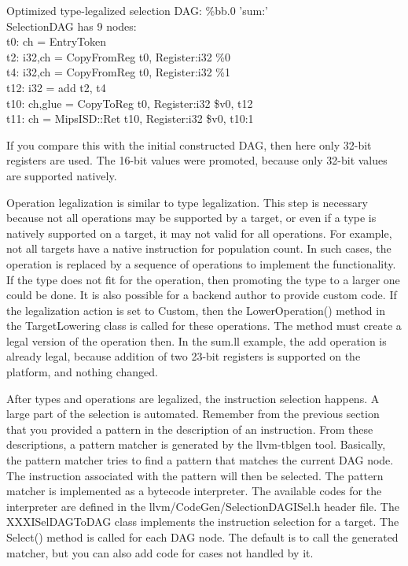 \begin{tcolorbox}[colback=white,colframe=black]
Optimized type-legalized selection DAG: \%bb.0 'sum:' \\
SelectionDAG has 9 nodes: \\
\hspace*{0.5cm}t0: ch = EntryToken \\
\hspace*{1.5cm}t2: i32,ch = CopyFromReg t0, Register:i32 \%0 \\
\hspace*{1.5cm}t4: i32,ch = CopyFromReg t0, Register:i32 \%1 \\
\hspace*{1cm}t12: i32 = add t2, t4 \\
\hspace*{0.5cm}t10: ch,glue = CopyToReg t0, Register:i32 \$v0, t12 \\
\hspace*{0.5cm}t11: ch = MipsISD::Ret t10, Register:i32 \$v0, t10:1
\end{tcolorbox}

If you compare this with the initial constructed DAG, then here only 32-bit registers are used. The 16-bit values were promoted, because only 32-bit values are supported natively.\par

Operation legalization is similar to type legalization. This step is necessary because not all operations may be supported by a target, or even if a type is natively supported on a target, it may not valid for all operations. For example, not all targets have a native instruction for population count. In such cases, the operation is replaced by a sequence of operations to implement the functionality. If the type does not fit for the operation, then promoting the type to a larger one could be done. It is also possible for a backend author to provide custom code. If the legalization action is set to Custom, then the LowerOperation() method in the TargetLowering class is called for these operations. The method must create a legal version of the operation then. In the sum.ll example, the add operation is already legal, because addition of two 23-bit registers is supported on the platform, and nothing changed.\par

After types and operations are legalized, the instruction selection happens. A large part of the selection is automated. Remember from the previous section that you provided a pattern in the description of an instruction. From these descriptions, a pattern matcher is generated by the llvm-tblgen tool. Basically, the pattern matcher tries to find a pattern that matches the current DAG node. The instruction associated with the pattern will then be selected. The pattern matcher is implemented as a bytecode interpreter. The available codes for the interpreter are defined in the llvm/CodeGen/SelectionDAGISel.h header file. The XXXISelDAGToDAG class implements the instruction selection for a target. The Select() method is called for each DAG node. The default is to call the generated matcher, but you can also add code for cases not handled by it.\par

